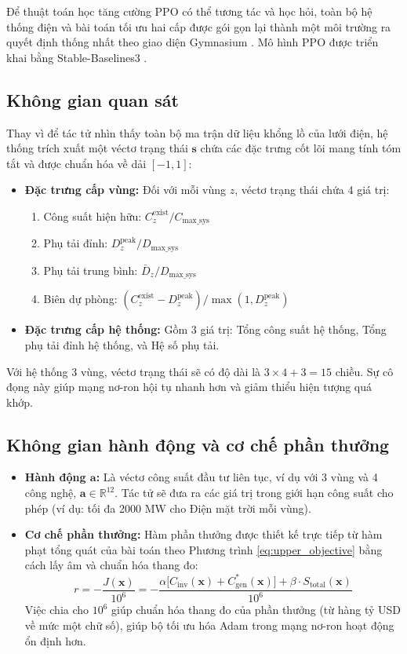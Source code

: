 Để thuật toán học tăng cường PPO có thể tương tác và học hỏi, toàn bộ hệ thống điện và bài toán tối ưu hai cấp được gói gọn lại thành một môi trường ra quyết định thống nhất theo giao diện Gymnasium \cite{towers2024gymnasium}. Mô hình PPO được triển khai bằng Stable-Baselines3 \cite{raffin2021sb3}.

\subsection{Không gian quan sát}
Thay vì để tác tử nhìn thấy toàn bộ ma trận dữ liệu khổng lồ của lưới điện, hệ thống trích xuất một véctơ trạng thái $\mathbf{s}$ chứa các đặc trưng cốt lõi mang tính tóm tắt và được chuẩn hóa về dải $[-1, 1]$:
\begin{itemize}
    \item \textbf{Đặc trưng cấp vùng:} Đối với mỗi vùng $z$, véctơ trạng thái chứa 4 giá trị:
    \begin{enumerate}
        \item Công suất hiện hữu: $C_{z}^{\text{exist}} / C_{\text{max\_sys}}$
        \item Phụ tải đỉnh: $D_{z}^{\text{peak}} / D_{\text{max\_sys}}$
        \item Phụ tải trung bình: $\bar{D}_{z} / D_{\text{max\_sys}}$
        \item Biên dự phòng: $(C_{z}^{\text{exist}} - D_{z}^{\text{peak}}) / \max(1, D_{z}^{\text{peak}})$
    \end{enumerate}
    \item \textbf{Đặc trưng cấp hệ thống:} Gồm 3 giá trị: Tổng công suất hệ thống, Tổng phụ tải đỉnh hệ thống, và Hệ số phụ tải.
\end{itemize}
Với hệ thống 3 vùng, véctơ trạng thái sẽ có độ dài là $3 \times 4 + 3 = 15$ chiều. Sự cô đọng này giúp mạng nơ-ron hội tụ nhanh hơn và giảm thiểu hiện tượng quá khớp.

\subsection{Không gian hành động và cơ chế phần thưởng}
\begin{itemize}
    \item \textbf{Hành động $\mathbf{a}$:} Là véctơ công suất đầu tư liên tục, ví dụ với 3 vùng và 4 công nghệ, $\mathbf{a} \in \mathbb{R}^{12}$. Tác tử sẽ đưa ra các giá trị trong giới hạn công suất cho phép (ví dụ: tối đa 2000 MW cho Điện mặt trời mỗi vùng).
    \item \textbf{Cơ chế phần thưởng:} Hàm phần thưởng được thiết kế trực tiếp từ hàm phạt tổng quát của bài toán theo Phương trình \ref{eq:upper_objective} bằng cách lấy âm và chuẩn hóa thang đo:
    \begin{equation}
        r = - \frac{J(\mathbf{x})}{10^6} = - \frac{\alpha \big[C_{\text{inv}}(\mathbf{x}) + C_{\text{gen}}^*(\mathbf{x})\big] + \beta \cdot S_{\text{total}}(\mathbf{x})}{10^6}
    \end{equation}
    Việc chia cho $10^6$ giúp chuẩn hóa thang đo của phần thưởng (từ hàng tỷ USD về mức một chữ số), giúp bộ tối ưu hóa Adam trong mạng nơ-ron hoạt động ổn định hơn.
\end{itemize}

